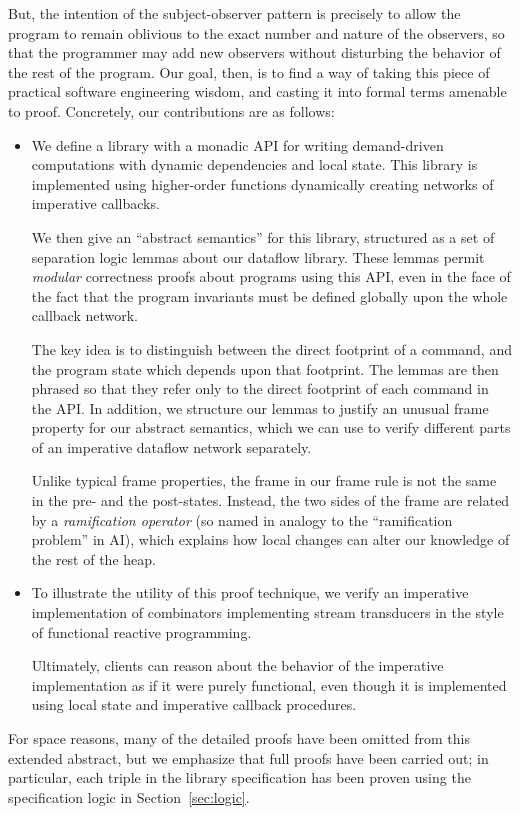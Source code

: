 \documentclass[natbib]{sigplanconf}
\begin{document}
But, the intention of the subject-observer pattern is
precisely to allow the program to remain oblivious to the exact number
and nature of the observers, so that the programmer may add new
observers without disturbing the behavior of the rest of the program.
Our goal, then, is to find a way of taking this piece of practical
software engineering wisdom, and casting it into formal terms amenable
to proof. Concretely, our contributions are as follows: 
\vspace{-1em}
\begin{itemize}
  \item We define a library with a monadic API for writing
    demand-driven computations with dynamic dependencies and local
    state. This library is implemented using higher-order functions
    dynamically creating networks of imperative callbacks.

    We then give an ``abstract semantics'' for this
    library, structured as a set of separation logic lemmas about our
    dataflow library. These lemmas permit \emph{modular} correctness
    proofs about programs using this API, even in the face of the fact
    that the program invariants must be defined globally upon the
    whole callback network.

    The key idea is to distinguish between the direct footprint of a
    command, and the program state which depends upon that
    footprint. The lemmas are then phrased so that they refer only to
    the direct footprint of each command in the API. In addition, we
    structure our lemmas to justify an unusual frame property for our
    abstract semantics, which we can use to verify different parts of
    an imperative dataflow network separately.

    Unlike typical frame properties, the frame in our frame rule is
    not the same in the pre- and the post-states. Instead, the two
    sides of the frame are related by a \emph{ramification operator}
    (so named in analogy to the ``ramification problem'' in AI), which
    explains how local changes can alter our knowledge of the rest of
    the heap.

  \item To illustrate the utility of this proof technique, we verify
    an imperative implementation of combinators implementing stream
    transducers in the style of functional reactive programming. 

    Ultimately, clients can reason about the behavior of the imperative
    implementation as if it were purely functional, even though it
    is implemented using local state and imperative callback
    procedures.
\end{itemize}
%
For space reasons, many of the detailed proofs have been omitted from
this extended abstract, but we emphasize that full proofs have been
carried out; in particular, each triple in the library specification
has been proven using the specification logic in
Section~\ref{sec:logic}.
\end{document}
